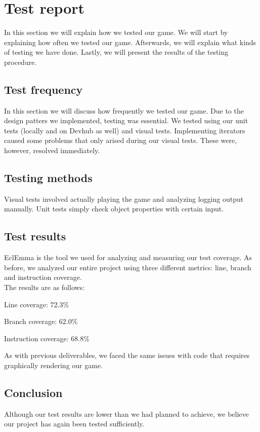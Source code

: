 \documentclass[a4paper,11pt,report]{scrartcl}
\begin{document}
\newpage\section{Test report}

In this section we will explain how we tested our game. We will start by
explaining how often we tested our game. Afterwards, we will explain what
kinds of testing we have done. Lastly, we will present the results of the
testing procedure.

\subsection{Test frequency}
In this section we will discuss how frequently we tested our game. Due to the
design patters we implemented, testing was essential. We tested using our
unit tests (locally and on Devhub as well) and visual tests. Implementing
iterators caused some problems that only arised during our visual tests. These
were, however, resolved immediately.

\subsection{Testing methods}
Visual tests involved actually playing the game and analyzing logging output
manually. Unit tests simply check object properties with certain input.

\subsection{Test results}
EclEmma is the tool we used for analyzing and measuring our test coverage.
As before, we analyzed our entire project using three different metrics: line,
branch and instruction coverage.\\

The results are as follows:
\begin{description}
	\item Line coverage: 72.3\%
	\item Branch coverage: 62.0\%
	\item Instruction coverage: 68.8\%
\end{description}
As with previous deliverables, we faced the same issues with code that requires
graphically rendering our game. 

\subsection{Conclusion}
Although our test results are lower than we had planned to achieve, we believe
our project has again been tested sufficiently.
\end{document}

